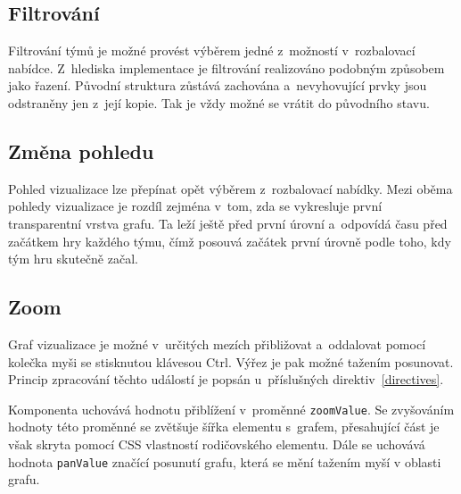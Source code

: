 \documentclass[
  digital, %
  oneside, %
  table,   %
  nolof,     %
  nolot,     %
  nocover
]{fithesis3}
\begin{document}
\subsection{Filtrování}
Filtrování týmů je možné provést výběrem jedné z~možností v~rozbalovací nabídce. Z~hlediska implementace je filtrování realizováno podobným způsobem jako řazení. Původní struktura zůstává zachována a~nevyhovující prvky jsou odstraněny jen z~její kopie. Tak je vždy možné se vrátit do původního stavu.
\subsection{Změna pohledu}
Pohled vizualizace lze přepínat opět výběrem z~rozbalovací nabídky. Mezi oběma pohledy vizualizace je rozdíl zejména v~tom, zda se vykresluje první transparentní vrstva grafu. Ta leží ještě před první úrovní a~odpovídá času před začátkem hry každého týmu, čímž posouvá začátek první úrovně podle toho, kdy tým hru skutečně začal.
\subsection{Zoom}
Graf vizualizace je možné v~určitých mezích přibližovat a~oddalovat pomocí kolečka myši se stisknutou klávesou Ctrl. Výřez je pak možné tažením posunovat. Princip zpracování těchto událostí je popsán u~příslušných direktiv~\ref{directives}.\par
Komponenta uchovává hodnotu přiblížení v~proměnné \verb|zoomValue|. Se zvyšováním hodnoty této proměnné se zvětšuje šířka elementu s~grafem, přesahující část je však skryta pomocí CSS vlastností rodičovského elementu. Dále se uchovává hodnota \verb|panValue| značící posunutí grafu, která se mění tažením myší v oblasti grafu. 
\end{document}
